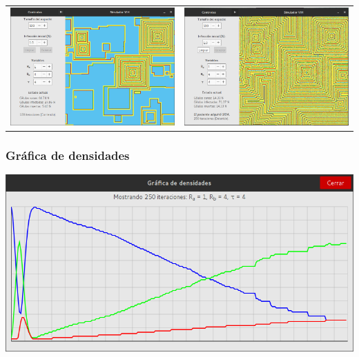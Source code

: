 \documentclass[12pt,letterpaper,oneside]{report}
\begin{document}
	\begin{center}
		\begin{tabular}{c c}
		\includegraphics[width=8cm]{img/original/min/3.png} & \includegraphics[width=8cm]{img/original/min/4.png} \\
		\end{tabular}
	\end{center}

	\subsubsection{Gráfica de densidades}
	\begin{center}
		\includegraphics[width=14cm]{img/original/min/g.png}
	\end{center}
\end{document}
